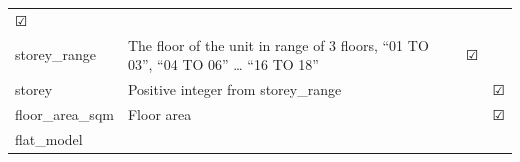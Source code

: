\documentclass[]{book}
\begin{document}
\begin{longtable}[]{@{}llll@{}}
\begin{minipage}[t]{0.04\columnwidth}
☑\strut
\end{minipage} & \begin{minipage}[t]{0.05\columnwidth}\raggedright\strut
\strut
\end{minipage}\tabularnewline
\begin{minipage}[t]{0.09\columnwidth}\raggedright\strut
storey\_range\strut
\end{minipage} & \begin{minipage}[t]{0.70\columnwidth}\raggedright\strut
The floor of the unit in range of 3 floors, ``01 TO 03'', ``04 TO 06''
\ldots{} ``16 TO 18''\strut
\end{minipage} & \begin{minipage}[t]{0.04\columnwidth}\raggedright\strut
☑\strut
\end{minipage} & \begin{minipage}[t]{0.05\columnwidth}\raggedright\strut
\strut
\end{minipage}\tabularnewline
\begin{minipage}[t]{0.09\columnwidth}\raggedright\strut
storey\strut
\end{minipage} & \begin{minipage}[t]{0.70\columnwidth}\raggedright\strut
Positive integer from storey\_range\strut
\end{minipage} & \begin{minipage}[t]{0.04\columnwidth}\raggedright\strut
\strut
\end{minipage} & \begin{minipage}[t]{0.05\columnwidth}\raggedright\strut
☑\strut
\end{minipage}\tabularnewline
\begin{minipage}[t]{0.09\columnwidth}\raggedright\strut
floor\_area\_sqm\strut
\end{minipage} & \begin{minipage}[t]{0.70\columnwidth}\raggedright\strut
Floor area\strut
\end{minipage} & \begin{minipage}[t]{0.04\columnwidth}\raggedright\strut
\strut
\end{minipage} & \begin{minipage}[t]{0.05\columnwidth}\raggedright\strut
☑\strut
\end{minipage}\tabularnewline
\begin{minipage}[t]{0.09\columnwidth}\raggedright\strut
flat\_model\strut
\end{minipage} & \begin{minipage}[t]{0.70\columnwidth}\raggedright\strut

\end{minipage}
\end{longtable}
\end{document}

